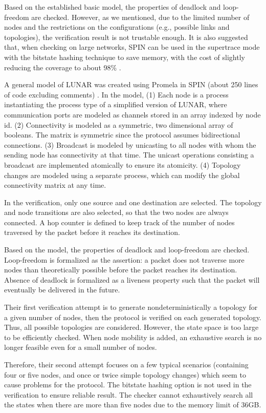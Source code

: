 \documentclass[a4paper,10pt,twocolumn]{article}
\begin{document}
Based on the established basic model, the properties of deadlock and loop-freedom are checked. However, as we mentioned, due to the limited number of nodes and the restrictions on the configurations (e.g., possible links and topologies), the verification result is not trustable enough. It is also suggested that, when checking on large networks, SPIN can be used in the supertrace mode with the bitstate hashing technique \cite{Hol98} to save memory, with the cost of slightly reducing the coverage to about 98\% \cite{RA04}.

A general model of LUNAR was created using Promela in SPIN (about 250 lines of code excluding comments) \cite{WPP04,WPP05}. In the model, (1) Each node is a process instantiating the process type of a simplified version of LUNAR, where communication ports are modeled as channels stored in an array indexed by node id. (2) Connectivity is modeled as a symmetric, two dimensional array of booleans. The matrix is symmetric since the protocol assumes bidirectional connections. (3) Broadcast is modeled by unicasting to all nodes with whom the sending node has connectivity at that time. The unicast operations consisting a broadcast are implemented atomically to ensure its atomicity. (4) Topology changes are modeled using a separate process, which can modify the global connectivity matrix at any time.

In the verification, only one source and one destination are selected. The topology and node transitions are also selected, so that the two nodes are always connected. A hop counter is defined to keep track of the number of nodes traversed by the packet before it reaches its destination.

Based on the model, the properties of deadlock and loop-freedom are checked. Loop-freedom is formalized as the assertion: a packet does not traverse more nodes than theoretically possible before the packet reaches its destination. Absence of deadlock is formalized as a liveness property such that the packet will eventually be delivered in the future.

Their first verification attempt is to generate nondeterministically a topology for a given number of nodes, then the protocol is verified on each generated topology. Thus, all possible topologies are considered. However, the state space is too large to be efficiently checked. When node mobility is added, an exhaustive search is no longer feasible even for a small number of nodes.

Therefore, their second attempt focuses on a few typical scenarios (containing four or five nodes, and once or twice simple topology changes) which seem to cause problems for the protocol. The bitstate hashing option is not used in the verification to ensure reliable result. The checker cannot exhaustively search all the states when there are more than five nodes due to the memory limit of 36GB.
\end{document}
